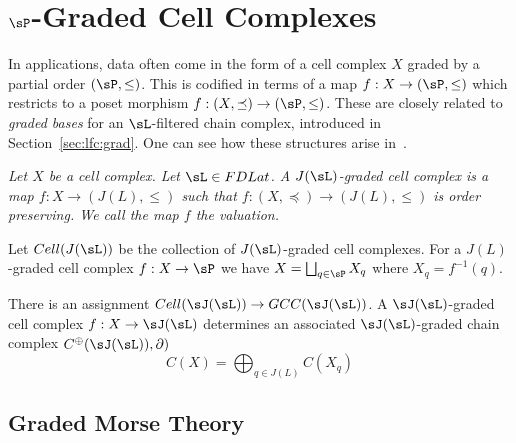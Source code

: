 



\section{$\sP$-Graded Cell Complexes}

In applications, data often come in the form of a cell complex $X$ graded by a partial order $(\sP,\leq)$.  This is codified in terms of a map $f:X\to (\sP,\leq)$ which restricts to a poset morphism $f:(X,\preceq)\to (\sP,\leq)$.  These are closely related to {\em graded bases} for an $\sL$-filtered chain complex, introduced in Section~\ref{sec:lfc:grad}.  One can see how these structures arise in~\cite{braids}.  

\begin{defn}
{\em
Let $X$ be a cell complex.  Let $\sL\in FDLat$.  A {\em $J(\sL)$-graded cell complex} is a map $f:X\to (J(L),\leq)$ such that $f:(X,\preceq)\to (J(L),\leq)$ is order preserving.  We call the map $f$ the {\em valuation}.
}
\end{defn}


Let $Cell(J(\sL))$ be the collection of $J(\sL)$-graded cell complexes.  For a $J(L)$-graded cell complex $f:X\to \sP$ we have $X=\bigsqcup_{q\in \sP} X_q$ where $X_q=f^{-1}(q)$.  

\begin{prop}
There is an assignment $Cell(\sJ(\sL))\to GCC(\sJ(\sL))$.  A $\sJ(\sL)$-graded cell complex $f:X\to \sJ(\sL)$ determines an associated $\sJ(\sL)$-graded chain complex $C^\oplus(\sJ(\sL)),\partial)$ $$C(X) = \bigoplus_{q\in J(L)} C(X_q)$$

\end{prop}










\subsection{Graded Morse Theory}

